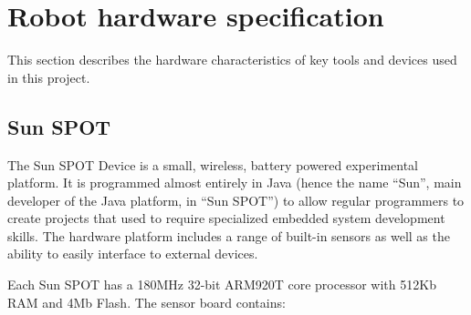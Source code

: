 \documentclass[a4paper,10pt]{article} %
\begin{document}


\pagebreak

\appendix

\section{Robot hardware specification} %
\label{app:robot-hardware}

This section describes the hardware characteristics of key tools and devices
used in this project.

\subsection{Sun SPOT} %
\label{app:Sun SPOT}

The Sun SPOT Device is a small, wireless, battery powered experimental platform.
It is programmed almost entirely in Java (hence the name ``Sun'', main developer
of the Java platform, in ``Sun SPOT'') to allow regular programmers to create
projects that used to require specialized embedded system development skills.
The hardware platform includes a range of built-in sensors as well as the
ability to easily interface to external devices.

Each Sun SPOT has a 180MHz 32-bit ARM920T core processor with 512Kb RAM and 4Mb
Flash. The sensor board contains:
\end{document}
